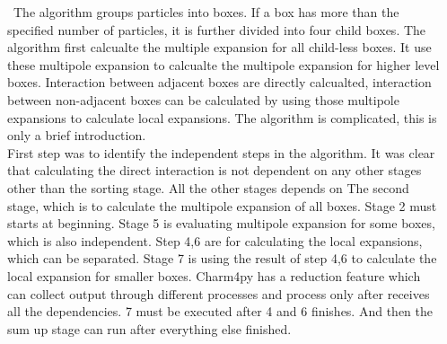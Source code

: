 \documentclass[final,t]{beamer}
\begin{document}
\begin{frame}[fragile]{}
\begin{columns}[t]
\begin{column}{.45\linewidth}
      \begin{tcolorbox}[toplevelbox,adjusted title=Tech Detail 1]
        \ The algorithm groups particles into boxes. If a box has more than the specified
        number of particles, it is further divided into four child boxes. The algorithm first calcualte the multiple expansion for all child-less boxes. It use these
        multipole expansion to calcualte the multipole expansion for higher level boxes.
        Interaction between adjacent boxes are directly calcualted, interaction between
        non-adjacent boxes can be calculated by using those multipole expansions to calculate local expansions. The algorithm is complicated, this is only a brief introduction.
        \\ First step was to identify the independent steps in the algorithm. It was clear that calculating the direct interaction is not dependent on any other stages other than the sorting stage. All the other stages depends on The second stage, which is to calculate the multipole expansion of all boxes. Stage 2 must starts at beginning. Stage 5 is evaluating multipole expansion for some boxes, which is also independent. Step 4,6 are for calculating the local expansions, which can be separated. Stage 7 is using the result of step 4,6 to calculate the local expansion for smaller boxes. Charm4py has a reduction feature which can
        collect output through different processes and process only after receives all
        the dependencies. 7 must be executed after 4 and 6 finishes. And then the sum up stage can run after everything else finished.
      \end{tcolorbox}

    \end{column}



    \begin{column}{.45\linewidth}
      \begin{tcolorbox}[toplevelbox,adjusted title=Tech Detail 2]
        \lipsum[5]
      \end{tcolorbox}

      \begin{tcolorbox}[toplevelbox,adjusted title=Results]
        \lipsum[6-7]
      \end{tcolorbox}

      \begin{tcolorbox}[toplevelbox,adjusted title=References]
        \lipsum[8]
      \end{tcolorbox}

    \end{column}


  \end{columns}
\end{frame}
\end{document}
